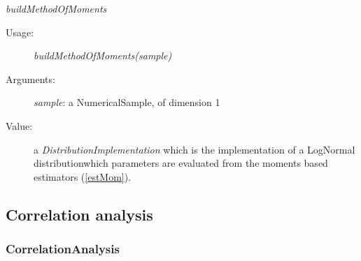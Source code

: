 \begin{description}
\begin{description}
\item \textit{buildMethodOfMoments}
\begin{description}
\item[Usage:]  \textit{buildMethodOfMoments(sample)}
\item[Arguments:] \textit{sample}: a  NumericalSample, of dimension 1
\item[Value:]  a \textit{DistributionImplementation} which is the implementation of a LogNormal distributionwhich parameters are evaluated from the moments based estimators (\ref{estMom}).
\end{description}

\end{description}
\end{description}





\newpage
\subsection{Correlation analysis}
\subsubsection{CorrelationAnalysis}


